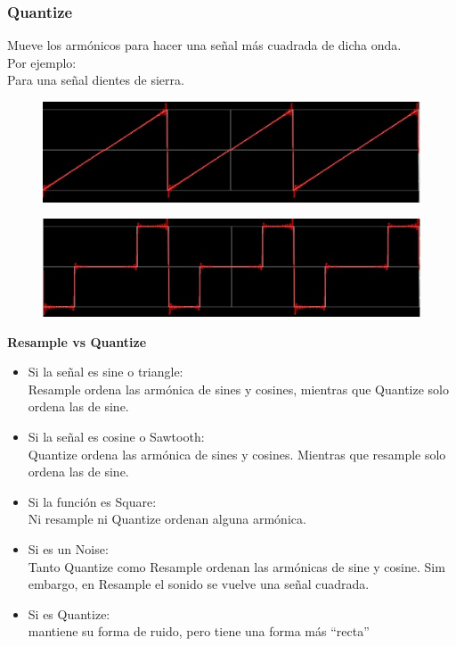 \documentclass[../main.tex]{subfiles}
\begin{document}
	\subsubsection{Quantize}
	Mueve los armónicos para hacer una señal más cuadrada de dicha onda.\\
	Por ejemplo:\\
	Para una señal dientes de sierra.
	\begin{figure}[H]
		\includegraphics[width= 0.6 \textwidth]{imagen13.png}
		\centering
	\end{figure}
	\begin{figure}[H]
		\includegraphics[width= 0.6 \textwidth]{imagen14.png}
		\centering
	\end{figure}
	\textbf{Resample vs Quantize}
	\begin{itemize}
		\item Si la señal es sine o triangle:\\ 
			Resample ordena las armónica de sines 
			y cosines, mientras que Quantize solo ordena las de sine. 

		\item	Si la señal es cosine o Sawtooth:\\ 
			Quantize ordena las armónica de sines y cosines.
			Mientras que resample solo ordena las de sine. 

		\item	Si la función es Square:\\
			Ni resample ni Quantize ordenan alguna armónica. 

		\item	Si es un Noise:\\
			Tanto Quantize como Resample ordenan las armónicas de sine y cosine.
			Sim embargo, en Resample el sonido se vuelve una señal cuadrada.

		\item Si es Quantize:\\
			mantiene su forma de ruido, pero tiene una forma más ``recta''
	\end{itemize}
\end{document}
